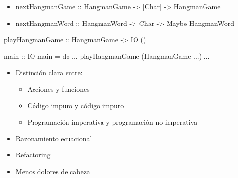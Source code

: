 \documentclass[spanish]{beamer}
\begin{document}

\begin{frame}[fragile]
  \begin{itemize}
  \item
    \begin{code}
nextHangmanGame :: HangmanGame
                -> [Char]
                -> HangmanGame
    \end{code}
  \item
    \begin{code}
nextHangmanWord :: HangmanWord
                -> Char
                -> Maybe HangmanWord
    \end{code}
  \end{itemize}
\end{frame}


\begin{frame}[fragile]
  \begin{code}
playHangmanGame :: HangmanGame -> IO ()
  \end{code}
\end{frame}


\begin{frame}[fragile]
  \begin{code}
main :: IO
main = do
  ...
  playHangmanGame (HangmanGame ...)
  ...
  \end{code}
\end{frame}


\begin{frame}
  \begin{itemize}
  \item
    Distinción clara entre:
    \begin{itemize}
    \item Acciones y funciones
    \item Código impuro y código impuro
    \item Programación imperativa y programación no imperativa
    \end{itemize}
  \item
    Razonamiento ecuacional
  \item
    Refactoring
  \item
    Menos dolores de cabeza
  \end{itemize}
\end{frame}
\end{document}

